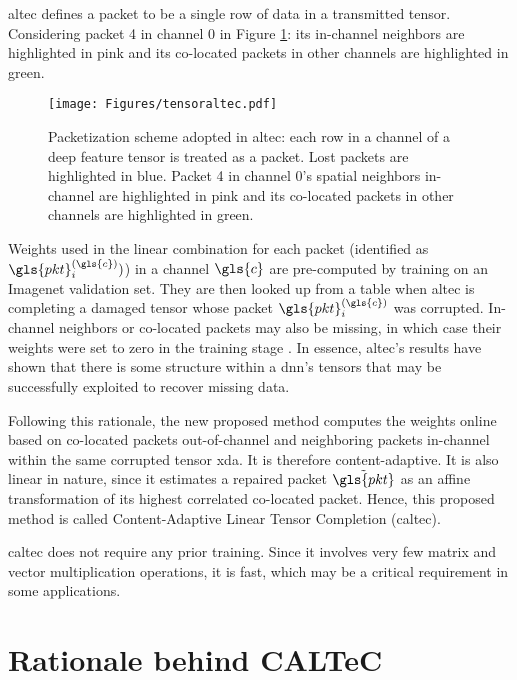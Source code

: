 \gls{altec} defines a packet to be a single row of data in a transmitted tensor. Considering packet 4 in channel 0 in Figure \ref{fig:altec}: its in-channel neighbors are highlighted in pink and its co-located packets in other channels are highlighted in green.
\begin{figure}[H]
	\centering
	\texttt{[image: Figures/tensoraltec.pdf]}
	\caption[Packetization scheme adopted in ALTeC]{Packetization scheme adopted in \gls{altec}: each row in a channel of a deep feature tensor is treated as a packet. Lost packets are highlighted in blue. Packet 4 in channel 0's spatial neighbors in-channel are highlighted in pink and its co-located packets in other channels are highlighted in green.}
	\label{fig:altec}
\end{figure}
Weights used in the linear combination for each packet (identified as $\gls{pkt}_i^{(\gls{c})})$) in a channel $\gls{c}$ are pre-computed by training on an Imagenet validation set. They are then looked up from a table when \gls{altec} is completing a damaged tensor whose packet $\gls{pkt}_i^{(\gls{c})}$ was corrupted. In-channel neighbors or co-located packets may also be missing, in which case their weights were set to zero in the training stage \cite{9017944}. In essence, \gls{altec}'s results have shown that there is some structure within a \gls{dnn}'s tensors that may be successfully exploited to recover missing data.

Following this rationale, the new proposed method computes the weights online based on co-located packets out-of-channel and neighboring packets in-channel within the same corrupted tensor \gls{xda}. It is therefore content-adaptive. It is also linear in nature, since it estimates a repaired packet $\tilde{\gls{pkt}}$ as an affine transformation of its highest correlated co-located packet. Hence, this proposed method is called Content-Adaptive Linear Tensor Completion (\gls{caltec}).

\gls{caltec} does not require any prior training. Since it involves very few matrix and vector multiplication operations, it is fast, which may be a critical requirement in some  applications.


\section{Rationale behind CALTeC} \label{sec:caltec:tensorviz}


